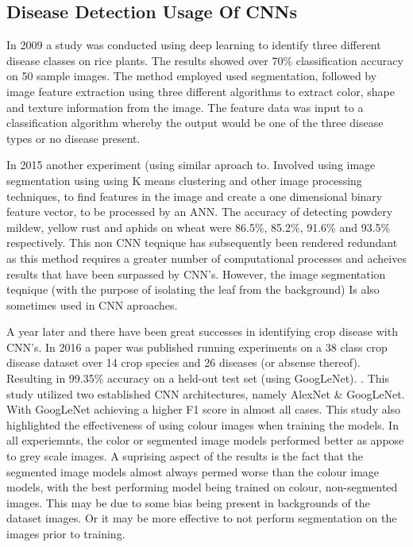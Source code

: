   \subsection{Disease Detection Usage Of CNNs}
  \par
  In 2009 a study was conducted using deep learning to identify three different disease classes on rice plants. The results showed over 70\% classification accuracy on 50 sample images. The method employed used segmentation, followed by image feature extraction using three different algorithms to extract color, shape and texture information from the image. The feature data was input to a classification algorithm whereby the output would be one of the three disease types or no disease present. \cite{Anthonys2009}
  \par
  In 2015 another experiment (using similar aproach to\cite{Anthonys2009}. Involved using image segmentation
  using using K means clustering and other image processing techniques, to find features in the image and create a one dimensional binary feature vector, to be processed by an ANN. \cite{Khirade2015} The accuracy of detecting powdery mildew, yellow rust and aphids on wheat were 86.5\%, 85.2\%, 91.6\% and 93.5\% respectively.
  This non CNN teqnique has subsequently been rendered redundant as this method requires a greater number of
  computational processes and acheives results that have been surpassed by CNN's. However, the image segmentation teqnique (with the purpose of isolating the leaf from the background) Is also sometimes used in CNN aproaches.
  \par
  A year later and there have been great successes in identifying crop disease with CNN's. In 2016 a paper was published running experiments on a 38 class crop disease dataset over 14 crop species and 26 diseases (or absense thereof). Resulting in 99.35\% accuracy on a held-out test set (using GoogLeNet). \cite{Mohanty2016}. This study utilized two established CNN architectures, namely AlexNet \cite{Krizhevsky} \& GoogLeNet. \cite{Szegedy_2015_CVPR} With GoogLeNet achieving a higher F1 score in almost all cases.
  This study also highlighted the effectiveness of using colour images when training the models. In all experiemnts, the color or segmented image models performed better as appose to grey scale images. A suprising aspect of the results is the fact that the segmented image models almost always permed worse than the colour image models, with the best performing model being trained on colour, non-segmented images. This may be due to some bias being present in backgrounds of the dataset images. Or it may be more effective to not perform segmentation on the images prior to training.

